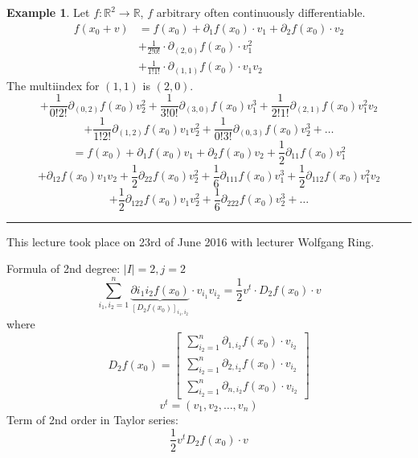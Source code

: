\documentclass[a4paper,landscape,twocolumn]{article}
\theoremstyle{definition}
\newtheorem{ex}{Example}
\newcommand\abs[1]{\left|#1\right|}
\newcommand\meta[3]{\hrule{} This #1 took place on #2 with lecturer #3.\par}
\begin{document}
\begin{ex}
  Let $f: \mathbb R^2 \to \mathbb R$, $f$ arbitrary often continuously differentiable.
  \begin{align*}
    f(x_0 + v)
    &= f(x_0) + \partial_1 f(x_0) \cdot v_1 + \partial_2 f(x_0) \cdot v_2 \\
    &+ \frac{1}{2! 0!} \cdot \partial_{(2,0)} f(x_0) \cdot v_1^2 \\
    &+ \frac{1}{1! 1!} \cdot \partial_{(1,1)} f(x_0) \cdot v_1 v_2
  \end{align*}
  The multiindex for $(1,1)$ is $(2,0)$.
  \[ + \frac{1}{0! 2!} \partial_{(0,2)} f(x_0) v_2^2 + \frac{1}{3! 0!} \partial_{(3,0)} f(x_0) v_1^3 + \frac{1}{2! 1!} \partial_{(2,1)} f(x_0) v_1^2 v_2 \]
  \[ + \frac{1}{1! 2!} \partial_{(1,2)} f(x_0) v_1 v_2^2 + \frac{1}{0! 3!} \partial_{(0,3)} f(x_0) v_2^3 + \ldots \]
  \[ = f(x_0) + \partial_1 f(x_0) v_1 + \partial_2 f(x_0) v_2 + \frac12 \partial_{11} f(x_0) v_1^2 \]
  \[ + \partial_{12} f(x_0) v_1 v_2 + \frac12 \partial_{22} f(x_0) v_2^2 + \frac16 \partial_{111} f(x_0) v_1^3 + \frac12 \partial_{112} f(x_0) v_1^2 v_2 \]
  \[ + \frac12 \partial_{122} f(x_0) v_1 v_2^2 + \frac16 \partial_{222} f(x_0) v_2^3 + \ldots \]
\end{ex}

\meta{lecture}{23rd of June 2016}{Wolfgang Ring}

Formula of 2nd degree: $\abs{I} = 2, j = 2$
\[ \sum_{i_1,i_2=1}^n \underbrace{\partial i_1 i_2 f(x_0)}_{[D_2 f(x_0)]_{i_1,i_2}} \cdot v_{i_1} v_{i_2} = \frac12 v^t \cdot D_2 f(x_0) \cdot v \]
where
\[ D_2f(x_0) =
\begin{bmatrix}
  \sum_{i_2=1}^n \partial_{1,i_2} f(x_0) \cdot v_{i_2} \\
  \sum_{i_2=1}^n \partial_{2,i_2} f(x_0) \cdot v_{i_2} \\
  \sum_{i_2=1}^n \partial_{n,i_2} f(x_0) \cdot v_{i_2}
\end{bmatrix}
\] \[
  v^t = (v_1, v_2, \ldots, v_n)
\]
Term of 2nd order in Taylor series:
\[ \frac12 v^t D_2 f(x_0) \cdot v \]
\end{document}
